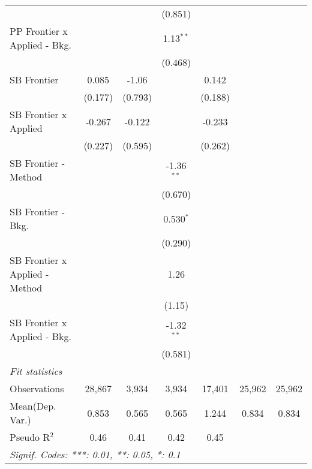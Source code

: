 \begin{tabular}{lcccccc}
                                  &               &              & (0.851)       &              &        &   \\   
   PP Frontier x Applied - Bkg.   &               &              & 1.13$^{**}$   &              &        &   \\   
                                  &               &              & (0.468)       &              &        &   \\   
   SB Frontier                    & 0.085         & -1.06        &               & 0.142        &        &   \\   
                                  & (0.177)       & (0.793)      &               & (0.188)      &        &   \\   
   SB Frontier x Applied          & -0.267        & -0.122       &               & -0.233       &        &   \\   
                                  & (0.227)       & (0.595)      &               & (0.262)      &        &   \\   
   SB Frontier - Method           &               &              & -1.36$^{**}$  &              &        &   \\   
                                  &               &              & (0.670)       &              &        &   \\   
   SB Frontier - Bkg.             &               &              & 0.530$^{*}$   &              &        &   \\   
                                  &               &              & (0.290)       &              &        &   \\   
   SB Frontier x Applied - Method &               &              & 1.26          &              &        &   \\   
                                  &               &              & (1.15)        &              &        &   \\   
   SB Frontier x Applied - Bkg.   &               &              & -1.32$^{**}$  &              &        &   \\   
                                  &               &              & (0.581)       &              &        &   \\   
   \midrule
   \emph{Fit statistics}\\
   Observations                   & 28,867        & 3,934        & 3,934         & 17,401       & 25,962 & 25,962\\  
Mean(Dep. Var.) & 0.853 & 0.565 & 0.565 & 1.244 & 0.834 & 0.834 \\
   Pseudo R$^2$                   & 0.46          & 0.41         & 0.42          & 0.45         &        & \\  
   \midrule \midrule
   \multicolumn{7}{l}{\emph{Signif. Codes: ***: 0.01, **: 0.05, *: 0.1}}\\
\end{tabular}
\par\endgroup
